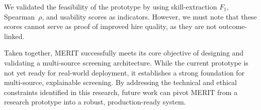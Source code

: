 We validated the feasibility of the prototype by using skill-extraction $F_1$, Spearman~$\rho$, and usability scores as indicators.
However, we must note that these scores cannot serve as proof of improved hire quality, as they are not outcome-linked.

Taken together, MERIT successfully meets its core objective of designing and validating a multi-source screening architecture.
While the current prototype is not yet ready for real-world deployment, it establishes a strong foundation for multi-source, explainable screening.
By addressing the technical and ethical constraints identified in this research, future work can pivot MERIT from a research prototype into a robust, production-ready system.
